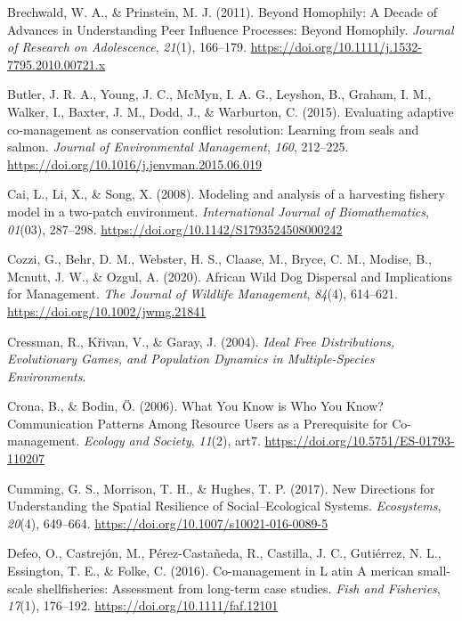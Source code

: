 \documentclass[
  12pt,
]{article}
\newlength{\cslhangindent}
\newenvironment{CSLReferences}[2] %
 {\begin{list}{}{%
  \setlength{\itemindent}{0pt}
  \setlength{\leftmargin}{0pt}
  \setlength{\parsep}{0pt}
  \ifodd #1
   \setlength{\leftmargin}{\cslhangindent}
   \setlength{\itemindent}{-1\cslhangindent}
  \fi
  \setlength{\itemsep}{#2\baselineskip}}}
 {\end{list}}
\begin{document}
\begin{CSLReferences}{1}{2}
Brechwald, W. A., \& Prinstein, M. J. (2011). Beyond {Homophily}: {A Decade} of {Advances} in {Understanding Peer Influence Processes}: {Beyond Homophily}. \emph{Journal of Research on Adolescence}, \emph{21}(1), 166--179. \url{https://doi.org/10.1111/j.1532-7795.2010.00721.x}

Butler, J. R. A., Young, J. C., McMyn, I. A. G., Leyshon, B., Graham, I. M., Walker, I., Baxter, J. M., Dodd, J., \& Warburton, C. (2015). Evaluating adaptive co-management as conservation conflict resolution: {Learning} from seals and salmon. \emph{Journal of Environmental Management}, \emph{160}, 212--225. \url{https://doi.org/10.1016/j.jenvman.2015.06.019}

Cai, L., Li, X., \& Song, X. (2008). Modeling and analysis of a harvesting fishery model in a two-patch environment. \emph{International Journal of Biomathematics}, \emph{01}(03), 287--298. \url{https://doi.org/10.1142/S1793524508000242}

Cozzi, G., Behr, D. M., Webster, H. S., Claase, M., Bryce, C. M., Modise, B., Mcnutt, J. W., \& Ozgul, A. (2020). African {Wild Dog Dispersal} and {Implications} for {Management}. \emph{The Journal of Wildlife Management}, \emph{84}(4), 614--621. \url{https://doi.org/10.1002/jwmg.21841}

Cressman, R., Křivan, V., \& Garay, J. (2004). \emph{Ideal {Free Distributions}, {Evolutionary Games}, and {Population Dynamics} in {Multiple-Species Environments}}.

Crona, B., \& Bodin, Ö. (2006). What {You Know} is {Who You Know}? {Communication Patterns Among Resource Users} as a {Prerequisite} for {Co-management}. \emph{Ecology and Society}, \emph{11}(2), art7. \url{https://doi.org/10.5751/ES-01793-110207}

Cumming, G. S., Morrison, T. H., \& Hughes, T. P. (2017). New {Directions} for {Understanding} the {Spatial Resilience} of {Social}--{Ecological Systems}. \emph{Ecosystems}, \emph{20}(4), 649--664. \url{https://doi.org/10.1007/s10021-016-0089-5}

Defeo, O., Castrejón, M., Pérez-Castañeda, R., Castilla, J. C., Gutiérrez, N. L., Essington, T. E., \& Folke, C. (2016). Co-management in {\textsc{L}} atin {\textsc{A}} merican small-scale shellfisheries: Assessment from long-term case studies. \emph{Fish and Fisheries}, \emph{17}(1), 176--192. \url{https://doi.org/10.1111/faf.12101}


\end{CSLReferences}
\end{document}
